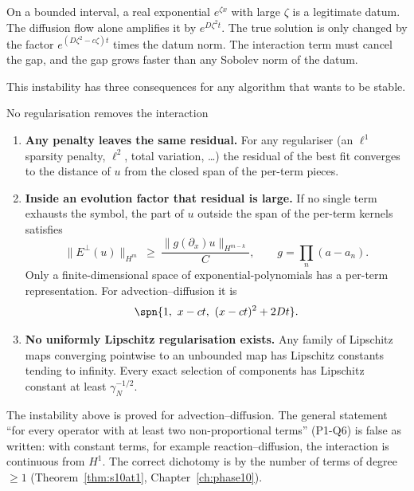 \begin{intuition}
On a bounded interval, a real exponential $e^{\zeta x}$ with large $\zeta$ is a legitimate datum. The diffusion flow alone amplifies it by $e^{D\zeta^2t}$. The true solution is only changed by the factor $e^{(D\zeta^2-c\zeta)t}$ times the datum norm. The interaction term must cancel the gap, and the gap grows faster than any Sobolev norm of the datum.
\end{intuition}

This instability has three consequences for any algorithm that wants to be stable.

\begin{theorem}{No regularisation removes the interaction  \proved}\label{thm:noreg}
\begin{enumerate}[label=(\alph*)]
\item \textbf{Any penalty leaves the same residual.} For any regulariser (an $\ell^1$ sparsity penalty, $\ell^2$, total variation, \dots) the residual of the best fit converges to the distance of $u$ from the closed span of the per-term pieces.
\item \textbf{Inside an evolution factor that residual is large.} If no single term exhausts the symbol, the part of $u$ outside the span of the per-term kernels satisfies
\[
\|E^\perp(u)\|_{H^m}\ \ge\ \frac{\|g(\partial_x)u\|_{H^{m-k}}}{C},\qquad g=\prod_n(a-a_n).
\]
Only a finite-dimensional space of exponential-polynomials has a per-term representation. For advection--diffusion it is
\[
\spn\{1,\ x-ct,\ (x-ct)^2+2Dt\}.
\]
\item \textbf{No uniformly Lipschitz regularisation exists.} Any family of Lipschitz maps converging pointwise to an unbounded map has Lipschitz constants tending to infinity. Every exact selection of components has Lipschitz constant at least $\gamma_N^{-1/2}$.
\end{enumerate}
\end{theorem}

\begin{caution}[title=Added in the complete edition (Phase 10)]
The instability above is proved for advection--diffusion. The general statement ``for every operator with at least two non-proportional terms'' (P1-Q6) is false as written: with constant terms, for example reaction--diffusion, the interaction is continuous from $H^1$. The correct dichotomy is by the number of terms of degree $\ge1$ (Theorem~\ref{thm:s10at1}, Chapter~\ref{ch:phase10}).
\end{caution}

